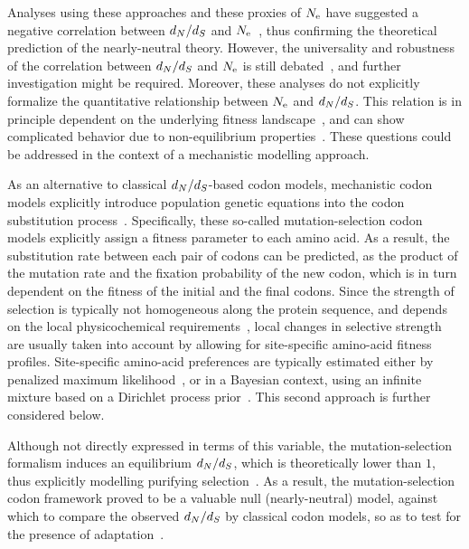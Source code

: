 \documentclass{MBE}
\begin{document}
	Analyses using these approaches and these proxies of $N_{\text{e}}$ have suggested a negative correlation between $d_N / d_S$ and $N_{\text{e}}$~\citep{Popadin2007, Lanfear2010, Lartillot2011, Lartillot2012, Romiguier2014, Figuet2017}, thus confirming the theoretical prediction of the {nearly-neutral} theory.
	However, the universality and robustness of the correlation between $d_N / d_S$ and $N_{\text{e}}$ is still debated~\citep{Nabholz2013,Lanfear2014,Figuet2016, Bolivar2019}, and further investigation might be required.
	Moreover, these analyses do not explicitly formalize the quantitative relationship between $N_{\text{e}}$ and $d_N / d_S$.
	This relation is in principle dependent on the underlying fitness landscape~\citep{Welch2008, Cherry1998}, and can show complicated behavior due to non-equilibrium properties~\citep{Jones2016}.
	These questions could be addressed in the context of a mechanistic modelling approach.

	As an alternative to classical $d_N / d_S$-based {codon} models, mechanistic {codon} models explicitly introduce population genetic equations into the {codon} {substitution} process~\citep{Halpern1998}.
	Specifically, these so-called mutation-selection {codon} models explicitly assign a fitness parameter to each amino acid.
	As a result, the {substitution} rate between each pair of codons can be predicted, as the product of the mutation rate and the fixation probability of the new {codon}, which is in turn dependent on the fitness of the initial and the final codons.
	Since the strength of selection is typically not homogeneous along the protein sequence, and depends on the local physicochemical requirements~\citep{Echave2016, Goldstein2016,Goldstein2017}, local changes in selective strength are usually taken into account by allowing for site-specific amino-acid fitness profiles.
	Site-specific amino-acid preferences are typically estimated either by penalized maximum likelihood~\citep{Tamuri2012,Tamuri2014}, or in a Bayesian context, using an infinite mixture based on a {Dirichlet process} prior~\citep{Rodrigue2010,Rodrigue2014}.
	This second approach is further considered below.

	Although not directly expressed in terms of this variable, the mutation-selection formalism induces an equilibrium $d_N / d_S$, which is theoretically lower than $1$, thus explicitly modelling purifying selection~\citep{Spielman2015, DosReis2015}.
	As a result, the mutation-selection codon framework proved to be a valuable null (nearly-neutral) model, against which to compare the observed $d_N / d_S$ by classical {codon} models, so as to test for the presence of adaptation~\citep{Rodrigue2016}.
\end{document}
